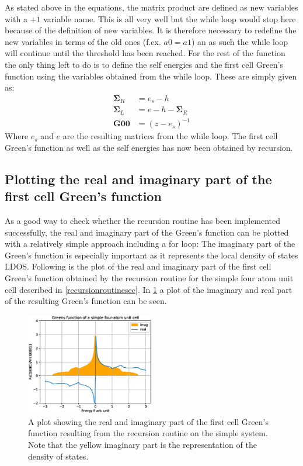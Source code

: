 As stated above in the equations, the matrix product are defined as new variables with a \(+1\) variable name. This is all very well but the while loop would stop here because of the definition of new variables. It is therefore necessary to redefine the new variables in terms of the old ones (f.ex. \(a0 = a1\)) an as such the while loop will continue until the threshold has been reached. For the rest of the function the only thing left to do is to define the self energies and the first cell Green's function using the variables obtained from the while loop. These are simply given as: 
\begin{align*}
    \mathbf{\Sigma}_R &= e_s - h \\
    \mathbf{\Sigma}_L &= e - h - \mathbf{\Sigma}_R \\
    \mathbf{G00} &= (z - e_s)^{-1}
\end{align*}
Where \(e_s\) and \(e\) are the resulting matrices from the while loop. The first cell Green's function as well as the self energies has now been obtained by recursion. 
\subsection{Plotting the real and imaginary part of the first cell Green's function}
As a good way to check whether the recursion routine has been implemented successfully, the real and imaginary part of the Green's function can be plotted with a relatively simple approach including a for loop:
The imaginary part of the Green's function is especially important as it represents the local density of states LDOS. Following is the plot of the real and imaginary part of the first cell Green's function obtained by the recursion routine for the simple four atom unit cell described in \cref{recursionroutinesec}. In \cref{imrealplot} a plot of the imaginary and real part of the resulting Green's function can be seen. 
\begin{figure}
    \centering
    \includegraphics[width = 0.5\textwidth]{Figures/imrealplot.eps}
    \caption{A plot showing the real and imaginary part of the first cell Green's function resulting from the recursion routine on the simple system. Note that the yellow imaginary part is the representation of the density of states.}
    \label{imrealplot}
\end{figure}
